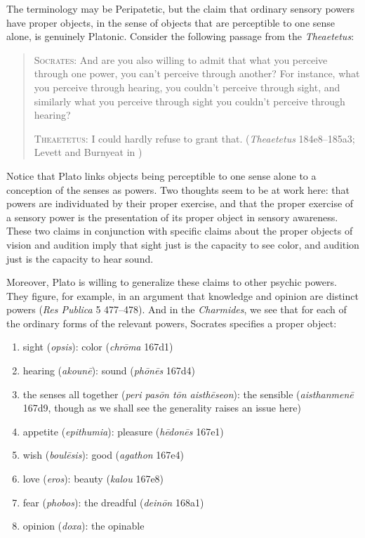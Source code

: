 The terminology may be Peripatetic, but the claim that ordinary sensory powers have proper objects, in the sense of objects that are perceptible to one sense alone, is genuinely Platonic. Consider the following passage from the \emph{Theaetetus}:
\begin{quotation}
	\textsc{Socrates}: And are you also willing to admit that what you perceive through one power, you can't perceive through another? For instance, what you perceive through hearing, you couldn't perceive through sight, and similarly what you perceive through sight you couldn't perceive through hearing?
	
	\textsc{Theaetetus}: I could hardly refuse to grant that. (\emph{Theaetetus} 184e8–185a3; Levett and Burnyeat in \citealt[204]{Cooper:1997fk})
\end{quotation}
Notice that Plato links objects being perceptible to one sense alone to a conception of the senses as powers. Two thoughts seem to be at work here: that powers are individuated by their proper exercise, and that the proper exercise of a sensory power is the presentation of its proper object in sensory awareness. These two claims in conjunction with specific claims about the proper objects of vision and audition imply that sight just is the capacity to see color, and audition just is the capacity to hear sound. 

Moreover, Plato is willing to generalize these claims to other psychic powers. They figure, for example, in an argument that knowledge and opinion are distinct powers (\emph{Res Publica} 5 477--478). And in the \emph{Charmides}, we see that for each of the ordinary forms of the relevant powers, Socrates specifies a proper object:
\begin{enumerate}[(1)]
	\item sight (\emph{opsis}): color (\emph{chrōma} 167d1)
	\item hearing (\emph{akounē}): sound (\emph{phōnēs} 167d4)
	\item the senses all together (\emph{peri pasōn tōn aisthēseon}): the sensible (\emph{aisthanmenē} 167d9, though as we shall see the generality raises an issue here)
	\item appetite (\emph{epithumia}): pleasure (\emph{hēdonēs} 167e1)
	\item wish (\emph{boulēsis}): good (\emph{agathon} 167e4)
	\item love (\emph{eros}): beauty (\emph{kalou} 167e8)
	\item fear (\emph{phobos}): the dreadful (\emph{deinōn} 168a1)
	\item opinion (\emph{doxa}): the opinable
\end{enumerate}

